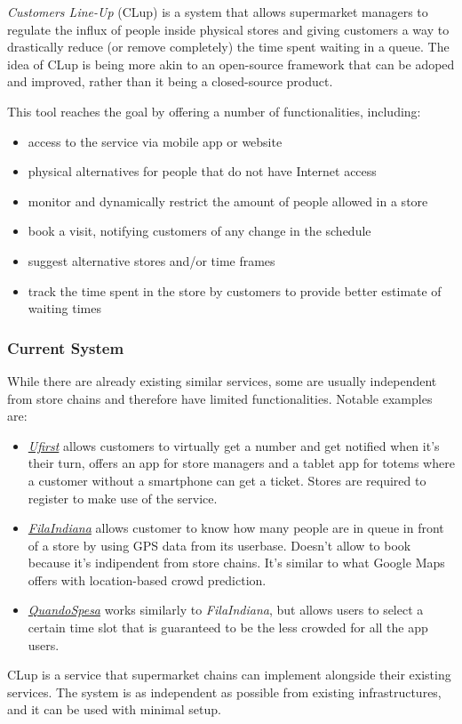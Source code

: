 \emph{Customers Line-Up} (CLup) is a system that allows supermarket managers to regulate the influx of people
inside physical stores and giving customers a way to drastically reduce (or remove completely) the time spent
waiting in a queue. The idea of CLup is being more akin to an open-source framework that can be adoped and improved, rather
than it being a closed-source product.

This tool reaches the goal by offering a number of functionalities, including:
\begin{itemize}
    \item access to the service via mobile app or website
    \item physical alternatives for people that do not have Internet access
    \item monitor and dynamically restrict the amount of people allowed in a store
    \item book a visit, notifying customers of any change in the schedule
    \item suggest alternative stores and/or time frames
    \item track the time spent in the store by customers to provide better estimate of waiting times
\end{itemize}



\subsubsection{Current System}
While there are already existing similar services, some are usually independent from store chains and
therefore have limited functionalities.
Notable examples are:
\begin{itemize}
    \item \href{https://www.ufirst.com}{\emph{Ufirst}} allows customers to virtually get a number
        and get notified when it's their turn, offers an app for store managers and a tablet app for totems
        where a customer without a smartphone can get a ticket. Stores are required to register to make use
        of the service.
    \item \href{https://play.google.com/store/apps/details?id=com.codaliscia}{\emph{FilaIndiana}} allows customer to
        know how many people are in queue in front of a store by using GPS data from its userbase. Doesn't allow to
        book because it's indipendent from store chains. It's similar to what Google Maps offers with location-based
        crowd prediction.
    \item \href{https://play.google.com/store/apps/details?id=it.anybot.quandospesa}{\emph{QuandoSpesa}} works similarly
        to \emph{FilaIndiana}, but allows users to select a certain time slot that is guaranteed to be the less crowded
        for all the app users.
    
\end{itemize} 
CLup is a service that supermarket chains can implement alongside
their existing services. The system is as independent as possible from existing infrastructures, and
it can be used with minimal setup.

